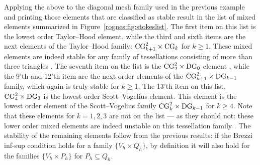 Applying the above to the diagonal mesh family used in the previous
example and printing those elements that are classified as stable
result in the list of mixed elements summarized in
Figure~\ref{rognes:fig:stokeslist}. The first item on this list is the
lowest order Taylor--Hood element, while the third and sixth items are
the next elements of the Taylor--Hood family:
$\mathrm{CG}_{k+1}^2 \times \mathrm{CG}_{k}$ for $k \geqslant
1$. These mixed elements are indeed stable for any family of
tessellations consisting of more than three
triangles \citep{TaylorHood1973, Stenberg1984, BrezziFalk1991}. The
seventh item on the list is the
$\mathrm{CG}_2^2 \times \mathrm{DG}_0$
element \citep{CrouzeixRaviart1973}, while the 9'th and 12'th item are
the next order elements of the $\mathrm{CG}_{k+1}^2 \times
\mathrm{DG}_{k-1}$ family, which again is truly stable for $k \geqslant
1$. The 13'th item on this list, $\mathrm{CG}_4^2 \times
\mathrm{DG}_3$ is the lowest order Scott--Vogelius element. This element
is the lowest order element of the Scott--Vogelius family
$\mathrm{CG}_{k}^2 \times \mathrm{DG}_{k-1}$ for $k \geqslant 4$. Note that
these elements for $k = 1, 2, 3$ are not on the list --- as they
should not: these lower order mixed elements are indeed unstable on
this tessellation family \citep{Qin1994}. The stability of the
remaining elements follow from the previous results: if the Brezzi
inf-sup condition holds for a family $\{V_h \times Q_h\}$, by
definition it will also hold for the families $\{V_h \times P_h\}$ for
$P_h \subseteq Q_h$.

